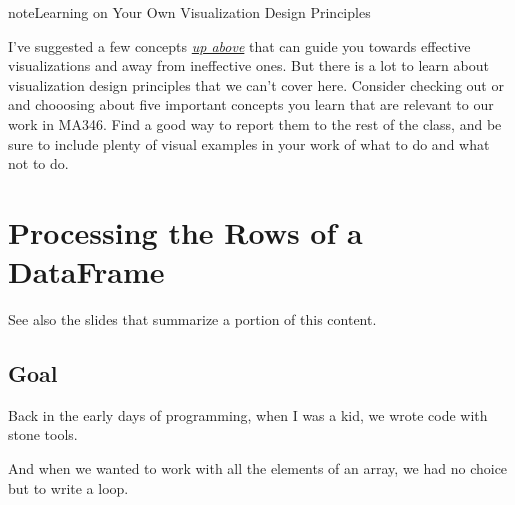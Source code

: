 \documentclass[letterpaper,10pt,english]{sphinxmanual}
\begin{document}
\begin{sphinxadmonition}{note}{Learning on Your Own \sphinxhyphen{} Visualization Design Principles}

I’ve suggested a few concepts {\hyperref[\detokenize{chapter-10-visualization:techniques-not-to-use-and-why}]{\emph{up above}}} that can guide you towards effective visualizations and away from ineffective ones.  But there is a lot to learn about visualization design principles that we can’t cover here.  Consider checking out  or  and chooosing about five important concepts you learn that are relevant to our work in MA346.  Find a good way to report them to the rest of the class, and be sure to include plenty of visual examples in your work of what to do and what not to do.
\end{sphinxadmonition}


\chapter{Processing the Rows of a DataFrame}
\label{\detokenize{chapter-11-processing-rows:processing-the-rows-of-a-dataframe}}\label{\detokenize{chapter-11-processing-rows::doc}}
See also the slides that summarize a portion of this content.


\section{Goal}
\label{\detokenize{chapter-11-processing-rows:goal}}
Back in the early days of programming, when I was a kid, we wrote code with stone tools.


And when we wanted to work with all the elements of an array, we had no choice but to write a loop.

\begin{sphinxVerbatim}[commandchars=\\\{\}]
  \PYG{p}{[}               \PYG{p}{]}

  
   
      

\end{sphinxVerbatim}
\end{document}
